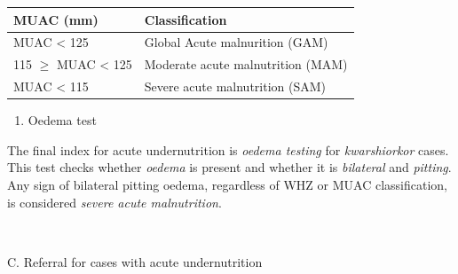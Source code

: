 \documentclass[12pt,]{book}
\providecommand{\tightlist}{%
  \setlength{\itemsep}{0pt}\setlength{\parskip}{0pt}}
\theoremstyle{definition}
\theoremstyle{definition}
\theoremstyle{definition}
\theoremstyle{remark}
\begin{document}
\begin{longtable}[]{@{}ll@{}}
\toprule
\begin{minipage}[b]{0.34\columnwidth}\raggedright
\textbf{MUAC (mm)}\strut
\end{minipage} & \begin{minipage}[b]{0.47\columnwidth}\raggedright
\textbf{Classification}\strut
\end{minipage}\tabularnewline
\midrule
\endhead
\begin{minipage}[t]{0.34\columnwidth}\raggedright
MUAC \textless{} 125\strut
\end{minipage} & \begin{minipage}[t]{0.47\columnwidth}\raggedright
Global Acute malnurition (GAM)\strut
\end{minipage}\tabularnewline
\begin{minipage}[t]{0.34\columnwidth}\raggedright
115 \(\geq\) MUAC \textless{} 125\strut
\end{minipage} & \begin{minipage}[t]{0.47\columnwidth}\raggedright
Moderate acute malnutrition (MAM)\strut
\end{minipage}\tabularnewline
\begin{minipage}[t]{0.34\columnwidth}\raggedright
MUAC \textless{} 115\strut
\end{minipage} & \begin{minipage}[t]{0.47\columnwidth}\raggedright
Severe acute malnutrition (SAM)\strut
\end{minipage}\tabularnewline
\bottomrule
\end{longtable}

\begin{enumerate}
\def\labelenumi{\arabic{enumi}.}
\setcounter{enumi}{2}
\tightlist
\item
  Oedema test
\end{enumerate}

The final index for acute undernutrition is \emph{oedema testing} for
\emph{kwarshiorkor} cases. This test checks whether \emph{oedema} is
present and whether it is \emph{bilateral} and \emph{pitting}. Any sign
of bilateral pitting oedema, regardless of WHZ or MUAC classification,
is considered \emph{severe acute malnutrition}.

~

C. Referral for cases with acute undernutrition
\end{document}
